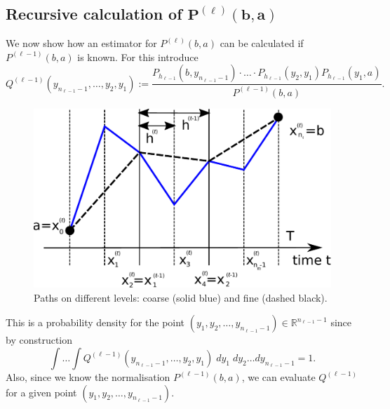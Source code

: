 \documentclass{article}
\begin{document}
\subsection{Recursive calculation of $\boldsymbol{P^{(\ell)}(b,a)}$}
We now show how an estimator for $P^{(\ell)}(b,a)$ can be calculated if $P^{(\ell-1)}(b,a)$ is known.
For this introduce
\begin{equation}
Q^{(\ell-1)}(y_{n_{\ell-1}-1},\dots,y_2,y_1) := \frac{
P_{h_{\ell-1}}(b,y_{n_{\ell-1}-1})\cdot\dots\cdot
P_{h_{\ell-1}}(y_2,y_1)P_{h_{\ell-1}}(y_1,a)
}{P^{(\ell-1)}(b,a)}.\label{eqn:Qc}
\end{equation}
\begin{figure}
\begin{center}
\includegraphics[width=0.5\linewidth]{grid_hierarchy.pdf}
\caption{Paths on different levels: coarse (solid blue) and fine (dashed black).}
\label{fig:grid_hierarchy}
\end{center}
\end{figure}
This is a probability density for the point $(y_1,y_2,\dots,y_{n_{\ell-1}-1})\in\mathbb{R}^{n_{\ell-1}-1}$ since by construction
\begin{equation}
\int\dots\int Q^{(\ell-1)}(y_{n_{\ell-1}-1},\dots,y_2,y_1)\;dy_1\;dy_2\dots dy_{n_{\ell-1}-1} = 1.
\end{equation}
Also, since we know the normalisation $P^{(\ell-1)}(b,a)$, we can evaluate $Q^{(\ell-1)}$ for a given point $(y_1,y_2,\dots,y_{n_{\ell-1}-1})$.
\end{document}
